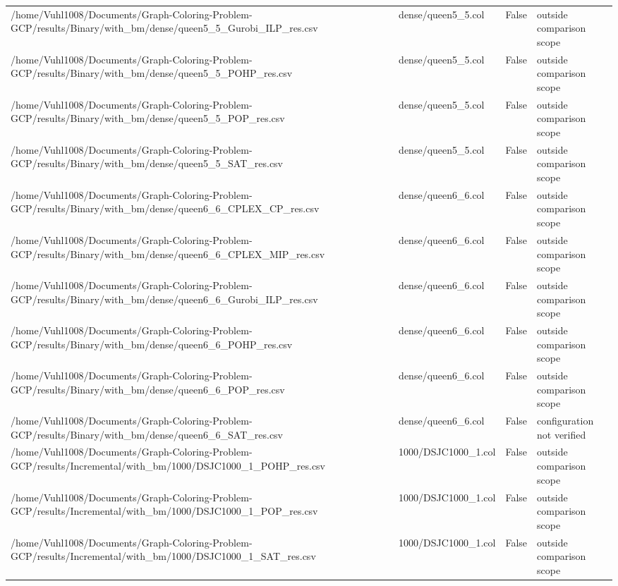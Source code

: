 \begin{table}[htbp]
\begin{tabular}{llll}
/home/Vuhl1008/Documents/Graph-Coloring-Problem-GCP/results/Binary/with\_bm/dense/queen5\_5\_Gurobi\_ILP\_res.csv & dense/queen5\_5.col & False & outside comparison scope \\
/home/Vuhl1008/Documents/Graph-Coloring-Problem-GCP/results/Binary/with\_bm/dense/queen5\_5\_POHP\_res.csv & dense/queen5\_5.col & False & outside comparison scope \\
/home/Vuhl1008/Documents/Graph-Coloring-Problem-GCP/results/Binary/with\_bm/dense/queen5\_5\_POP\_res.csv & dense/queen5\_5.col & False & outside comparison scope \\
/home/Vuhl1008/Documents/Graph-Coloring-Problem-GCP/results/Binary/with\_bm/dense/queen5\_5\_SAT\_res.csv & dense/queen5\_5.col & False & outside comparison scope \\
/home/Vuhl1008/Documents/Graph-Coloring-Problem-GCP/results/Binary/with\_bm/dense/queen6\_6\_CPLEX\_CP\_res.csv & dense/queen6\_6.col & False & outside comparison scope \\
/home/Vuhl1008/Documents/Graph-Coloring-Problem-GCP/results/Binary/with\_bm/dense/queen6\_6\_CPLEX\_MIP\_res.csv & dense/queen6\_6.col & False & outside comparison scope \\
/home/Vuhl1008/Documents/Graph-Coloring-Problem-GCP/results/Binary/with\_bm/dense/queen6\_6\_Gurobi\_ILP\_res.csv & dense/queen6\_6.col & False & outside comparison scope \\
/home/Vuhl1008/Documents/Graph-Coloring-Problem-GCP/results/Binary/with\_bm/dense/queen6\_6\_POHP\_res.csv & dense/queen6\_6.col & False & outside comparison scope \\
/home/Vuhl1008/Documents/Graph-Coloring-Problem-GCP/results/Binary/with\_bm/dense/queen6\_6\_POP\_res.csv & dense/queen6\_6.col & False & outside comparison scope \\
/home/Vuhl1008/Documents/Graph-Coloring-Problem-GCP/results/Binary/with\_bm/dense/queen6\_6\_SAT\_res.csv & dense/queen6\_6.col & False & configuration not verified \\
/home/Vuhl1008/Documents/Graph-Coloring-Problem-GCP/results/Incremental/with\_bm/1000/DSJC1000\_1\_POHP\_res.csv & 1000/DSJC1000\_1.col & False & outside comparison scope \\
/home/Vuhl1008/Documents/Graph-Coloring-Problem-GCP/results/Incremental/with\_bm/1000/DSJC1000\_1\_POP\_res.csv & 1000/DSJC1000\_1.col & False & outside comparison scope \\
/home/Vuhl1008/Documents/Graph-Coloring-Problem-GCP/results/Incremental/with\_bm/1000/DSJC1000\_1\_SAT\_res.csv & 1000/DSJC1000\_1.col & False & outside comparison scope \\

\end{tabular}
\end{table}
